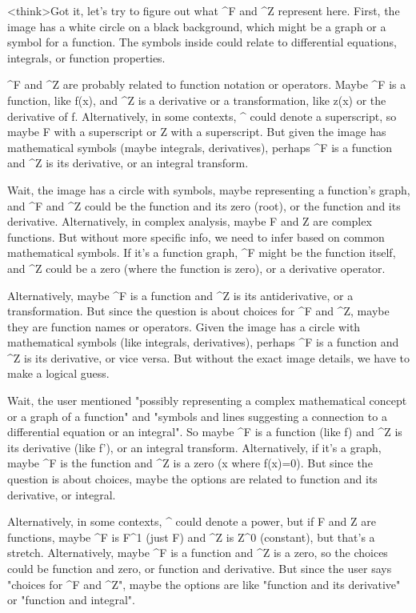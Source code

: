 <think>Got it, let's try to figure out what ^F and ^Z represent here. First, the image has a white circle on a black background, which might be a graph or a symbol for a function. The symbols inside could relate to differential equations, integrals, or function properties. 

^F and ^Z are probably related to function notation or operators. Maybe ^F is a function, like f(x), and ^Z is a derivative or a transformation, like z(x) or the derivative of f. Alternatively, in some contexts, ^ could denote a superscript, so maybe F with a superscript or Z with a superscript. But given the image has mathematical symbols (maybe integrals, derivatives), perhaps ^F is a function and ^Z is its derivative, or an integral transform. 

Wait, the image has a circle with symbols, maybe representing a function's graph, and ^F and ^Z could be the function and its zero (root), or the function and its derivative. Alternatively, in complex analysis, maybe F and Z are complex functions. But without more specific info, we need to infer based on common mathematical symbols. If it's a function graph, ^F might be the function itself, and ^Z could be a zero (where the function is zero), or a derivative operator. 

Alternatively, maybe ^F is a function and ^Z is its antiderivative, or a transformation. But since the question is about choices for ^F and ^Z, maybe they are function names or operators. Given the image has a circle with mathematical symbols (like integrals, derivatives), perhaps ^F is a function and ^Z is its derivative, or vice versa. But without the exact image details, we have to make a logical guess. 

Wait, the user mentioned "possibly representing a complex mathematical concept or a graph of a function" and "symbols and lines suggesting a connection to a differential equation or an integral". So maybe ^F is a function (like f) and ^Z is its derivative (like f'), or an integral transform. Alternatively, if it's a graph, maybe ^F is the function and ^Z is a zero (x where f(x)=0). But since the question is about choices, maybe the options are related to function and its derivative, or integral. 

Alternatively, in some contexts, ^ could denote a power, but if F and Z are functions, maybe ^F is F^1 (just F) and ^Z is Z^0 (constant), but that's a stretch. Alternatively, maybe ^F is a function and ^Z is a zero, so the choices could be function and zero, or function and derivative. But since the user says "choices for ^F and ^Z", maybe the options are like "function and its derivative" or "function and integral". 

